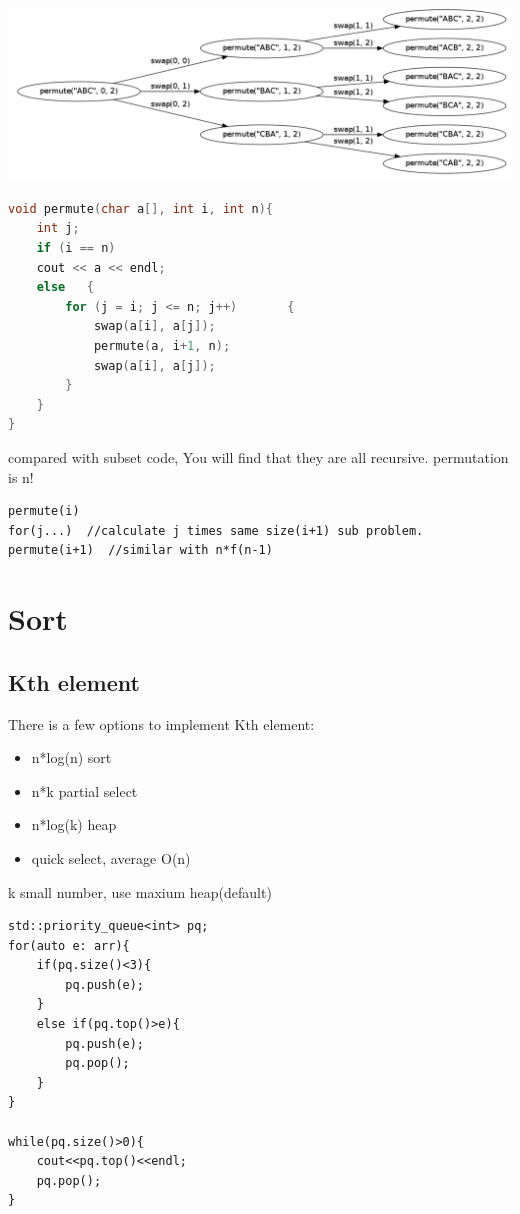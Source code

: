 \documentclass[a4paper,11pt,twoside]{book}
\begin{document}
\begin{center}
	\includegraphics[scale=0.25]{pics/permutation.png}
\end{center}


\begin{lstlisting}[frame=single, language=c++]
void permute(char a[], int i, int n){
	int j;
	if (i == n)
	cout << a << endl;
	else   {
		for (j = i; j <= n; j++)       {
			swap(a[i], a[j]);          
			permute(a, i+1, n);
			swap(a[i], a[j]);
		}
	}
} 		
\end{lstlisting}

	\par compared with subset code, You will find that they are all recursive. permutation is n!
\begin{lstlisting}
permute(i)
for(j...)  //calculate j times same size(i+1) sub problem.
permute(i+1)  //similar with n*f(n-1)		
\end{lstlisting}


\section{Sort}


\subsection{Kth element}

	\par There is a few options to implement Kth element:
	\begin{itemize}
		\item n*log(n) sort
		\item n*k partial select
		\item n*log(k) heap 
		\item quick select, average O(n)
	\end{itemize}

\par k small number, use maxium heap(default)
\begin{lstlisting}
std::priority_queue<int> pq;
for(auto e: arr){
	if(pq.size()<3){
		pq.push(e);
	}
	else if(pq.top()>e){
		pq.push(e);
		pq.pop();
	}
}

while(pq.size()>0){
	cout<<pq.top()<<endl;
	pq.pop();
}		
\end{lstlisting}
\end{document}
